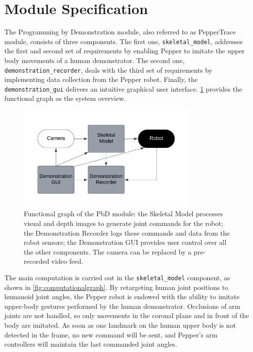 \documentclass{CSSRforAfrica}
\begin{document}
\newpage

\section{Module Specification}
The Programming by Demonstration module, also referred to as PepperTrace module, consists of three components. The first one, \texttt{skeletal\_model}, addresses the first and second set of requirements by enabling Pepper to imitate the upper body movements of a human demonstrator. The second one, \texttt{demonstration\_recorder}, deals with the third set of requirements by implementing data collection from the Pepper robot. Finally, the \texttt{demonstration\_gui} delivers an intuitive graphical user interface. \cref{fig:functionalgraph} provides the functional graph as the system overview.


\begin{figure}[ht!]
    \centering
    \includegraphics[width=0.8\textwidth]{figures/FunctionalGraph.png}
    \captionsetup{width=0.8\textwidth}
    \caption{Functional graph of the PbD module: the Skeletal Model processes visual and depth images to generate joint commands for the robot; the Demonstration Recorder logs these commands and data from the robot sensors; the Demonstration GUI provides user control over all the other components. The camera can be replaced by a pre-recorded video feed. }
    \label{fig:functionalgraph}
\end{figure}

\vspace{0.5cm}
The main computation is carried out in the \texttt{skeletal\_model} component, as shown in \cref{fig:computationalgraph}. By retargeting human joint positions to humanoid joint angles, the Pepper robot is endowed with the ability to imitate upper-body gestures performed by the human demonstrator. Occlusions of arm joints are not handled, so only movements in the coronal plane and in front of the body are imitated. As soon as one landmark on the human upper body is not detected in the frame, no new command will be sent, and Pepper's arm controllers will maintain the last commanded joint angles.
\end{document}
